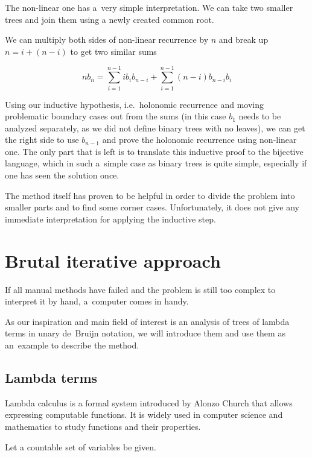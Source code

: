 \documentclass[final]{article}
\theoremstyle{definition}
\theoremstyle{definition}
\theoremstyle{remark}
\begin{document}
The non-linear one has a~very simple interpretation. We can take two smaller trees and join them using a newly created common root.

We can multiply both sides of non-linear recurrence by \(n\) and break up \(n = i + (n - i)\) to get two similar sums

\[n b_{n} = \sum_{i=1}^{n - 1} i b_{i} b_{n - i} + \sum_{i=1}^{n - 1} (n - i) b_{n - i} b_{i}\]

Using our inductive hypothesis, i.e.~holonomic recurrence and moving problematic boundary cases out from the sums (in this case \(b_{1}\) needs to be analyzed separately, as we did not define binary trees with no leaves), we can get the right side to use \(b_{n - 1}\) and prove the holonomic recurrence using non-linear one. The only part that is left is to translate this inductive proof to the bijective language, which in such a~simple case as binary trees is quite simple, especially if one has seen the solution once.

The method itself has proven to be helpful in order to divide the problem into smaller parts and to find some corner cases. Unfortunately, it does not give any immediate interpretation for applying the inductive step.

\section{Brutal iterative approach}%
\label{sec:brutal_iterative_approach}

If all manual methods have failed and the problem is still too complex to interpret it by hand, a~computer comes in handy.

As our inspiration and main field of interest is an analysis of trees of lambda terms in unary de~Bruijn notation, we will introduce them and use them as an~example to describe the method.

\subsection{Lambda terms}%
\label{sub:lambda_terms}

Lambda calculus is a formal system introduced by Alonzo Church that allows expressing computable functions. It is widely used in computer science and mathematics to study functions and their properties.

Let a countable set of variables be given.
\end{document}
